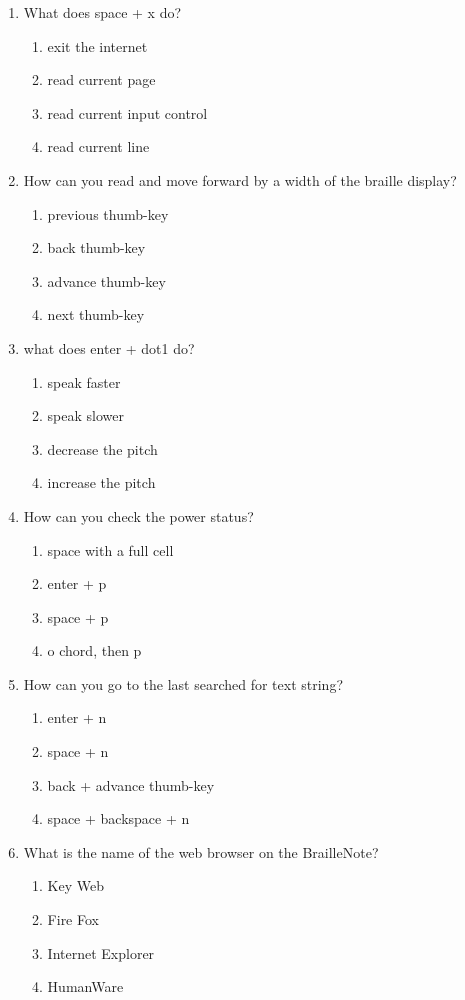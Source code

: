 \documentclass[10pt,letterpaper,twoside]{report}
\begin{document}
{\begin{enumerate}
	\item What does space + x do?
	      \begin{enumerate}
		      \item exit the internet
		      \item read current page
		      \item read current input control
		      \item read current line
	      \end{enumerate}
	\item How can you read and move forward by a width of the braille display?
	      \begin{enumerate}
		      \item previous thumb-key
		      \item back thumb-key
		      \item advance thumb-key
		      \item next thumb-key
	      \end{enumerate}
	\item what does enter + dot1 do?
	      \begin{enumerate}
		      \item speak faster
		      \item speak slower
		      \item decrease the pitch
		      \item increase the pitch
	      \end{enumerate}
	\item How can you check the power status?
	      \begin{enumerate}
		      \item space with a full cell
		      \item enter + p
		      \item space + p
		      \item o chord, then p
	      \end{enumerate}
	\item How can you go to the last searched for text string?
	      \begin{enumerate}
		      \item enter + n
		      \item space + n
		      \item back + advance thumb-key
		      \item space + backspace + n
	      \end{enumerate}
	\item What is the name of the web browser on the BrailleNote?
	      \begin{enumerate}
		      \item Key Web
		      \item Fire Fox
		      \item Internet Explorer
		      \item HumanWare
	      \end{enumerate}
\end{enumerate}

}
\end{document}
